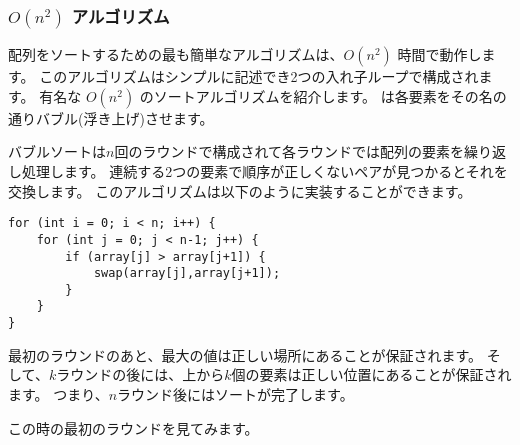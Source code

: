 \subsubsection{$O(n^2)$ アルゴリズム}

配列をソートするための最も簡単なアルゴリズムは、$O(n^2)$ 時間で動作します。
このアルゴリズムはシンプルに記述でき2つの入れ子ループで構成されます。
有名な $O(n^2)$ のソートアルゴリズムを紹介します。
は各要素をその名の通りバブル(浮き上げ)させます。

バブルソートは$n$回のラウンドで構成されて各ラウンドでは配列の要素を繰り返し処理します。
連続する2つの要素で順序が正しくないペアが見つかるとそれを交換します。
このアルゴリズムは以下のように実装することができます。

\begin{lstlisting}
for (int i = 0; i < n; i++) {
    for (int j = 0; j < n-1; j++) {
        if (array[j] > array[j+1]) {
            swap(array[j],array[j+1]);
        }
    }
}
\end{lstlisting}

最初のラウンドのあと、最大の値は正しい場所にあることが保証されます。
そして、$k$ラウンドの後には、上から$k$個の要素は正しい位置にあることが保証されます。
つまり、$n$ラウンド後にはソートが完了します。

\begin{center}
\end{center}

\noindent
この時の最初のラウンドを見てみます。

\begin{center}
\end{center}

